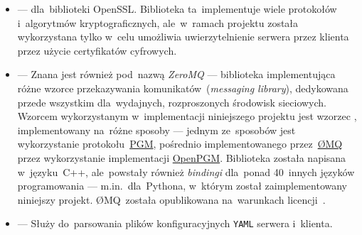 \documentclass[thesis]{subfiles}
\begin{document}
\begin{itemize}
	\item {} ---  dla~biblioteki OpenSSL. Biblioteka ta~implementuje wiele protokołów i~algorytmów kryptograficznych, ale~w~ramach projektu została wykorzystana tylko w~celu umożliwia uwierzytelnienie serwera przez klienta przez użycie certyfikatów cyfrowych.
	\item {} --- Znana jest również pod~nazwą \emph{ZeroMQ} --- biblioteka implementująca różne wzorce przekazywania komunikatów~(\emph{messaging library}), dedykowana przede wszystkim dla~wydajnych, rozproszonych środowisk sieciowych. Wzorcem wykorzystanym w~implementacji niniejszego projektu jest wzorzec , implementowany na~różne sposoby --- jednym ze~sposobów jest wykorzystanie protokołu~\hyperref[sec:pgm]{PGM}, pośrednio implementowanego przez~\href{https://en.wikipedia.org/wiki/ZeroMQ}{ØMQ} przez wykorzystanie implementacji \href{https://github.com/steve-o/openpgm}{OpenPGM}. Biblioteka została napisana w~języku~C++, ale~powstały również \emph{bindingi} dla~ponad 40~innych języków programowania --- m.in.~dla~Pythona, w~którym został zaimplementowany niniejszy projekt. ØMQ~została opublikowana na~warunkach licencji~.
	\item {} --- Służy do~parsowania plików konfiguracyjnych \texttt{YAML} serwera i~klienta.
\end{itemize}
\end{document}
